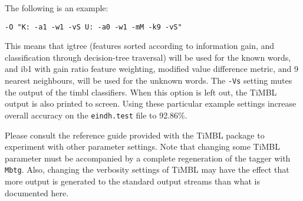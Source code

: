 \documentclass{report}
\begin{document}
The following is an example: 

{\small
\begin{verbatim}
-O "K: -a1 -w1 -vS U: -a0 -w1 -mM -k9 -vS" 
\end{verbatim}
}

This means that {\sc igtree} (features sorted according to information
gain, and classification through decision-tree traversal) will be used
for the known words, and {\sc ib1} with gain ratio feature weighting,
modified value difference metric, and 9 nearest neighbours, will be
used for the unknown words. The {\tt -Vs} setting mutes the output of the {\sc
timbl} classifiers. When this option is left out, the TiMBL
output is also printed to screen. Using these particular example
settings increase overall accuracy on the {\tt eindh.test} file to
92.86\%.

Please consult the reference guide provided with the TiMBL
package to experiment with other parameter settings. Note that
changing some TiMBL parameter must be accompanied by a complete
regeneration of the tagger with {\tt Mbtg}. Also, changing the
verbosity settings of TiMBL may have the effect that more output
is generated to the standard output streams than what is documented here.

\clearpage



\end{document}
